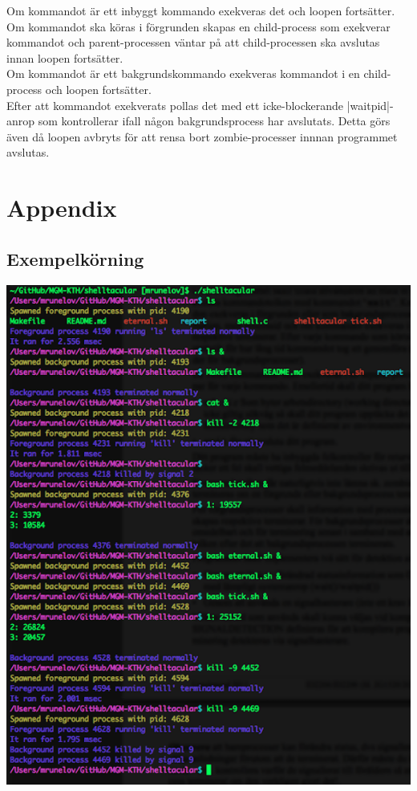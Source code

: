 \documentclass[paper=a4, fontsize=11pt]{scrartcl} %
\numberwithin{equation}{section} %
\numberwithin{figure}{section} %
\numberwithin{table}{section} %
\begin{document}
Om kommandot är ett inbyggt kommando exekveras det och loopen fortsätter.\\
Om kommandot ska köras i förgrunden skapas en child-process som exekverar kommandot
och parent-processen väntar på att child-processen ska avslutas innan loopen fortsätter.\\
Om kommandot är ett bakgrundskommando exekveras kommandot i en child-process och loopen fortsätter.\\

Efter att kommandot exekverats pollas det med ett icke-blockerande |waitpid|-anrop som kontrollerar ifall
någon bakgrundsprocess har avslutats. Detta görs även då loopen avbryts för att rensa bort zombie-processer innnan programmet avslutas.



\newpage
\section*{Appendix}
\subsection*{Exempelkörning}
\hspace*{-2cm}
\includegraphics[scale=0.9]{"test3"}


\end{document}
